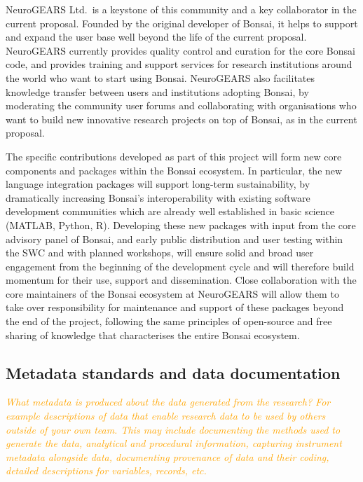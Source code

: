 \documentclass[a4paper,11pt]{article}
\begin{document}
NeuroGEARS Ltd.\ is a keystone of this community and a key collaborator in the
current proposal. Founded by the original developer of Bonsai, it helps to
support and expand the user base well beyond the life of the current proposal.
NeuroGEARS currently provides quality control and curation for the core Bonsai
code, and provides training and support services for research institutions
around the world who want to start using Bonsai. NeuroGEARS also facilitates
knowledge transfer between users and institutions adopting Bonsai, by
moderating the community user forums and collaborating with organisations who
want to build new innovative research projects on top of Bonsai, as in the
current proposal.

The specific contributions developed as part of this project will form new core
components and packages within the Bonsai ecosystem. In particular, the new
language integration packages will support long-term sustainability, by
dramatically increasing Bonsai's interoperability with existing software
development communities which are already well established in basic science
(MATLAB, Python, R). Developing these new packages with input from the core
advisory panel of Bonsai, and early public distribution and user testing within
the SWC and with planned workshops, will ensure solid and broad user engagement
from the beginning of the development cycle and will therefore build momentum
for their use, support and dissemination. Close collaboration with the core
maintainers of the Bonsai ecosystem at NeuroGEARS will allow them to take over
responsibility for maintenance and support of these packages beyond the end of
the project, following the same principles of open-source and free sharing of
knowledge that characterises the entire Bonsai ecosystem.

\subsection{Metadata standards and data documentation}

\textcolor{orange}{\textit{What metadata is produced about the data generated from the research? For example descriptions of data that enable research data to be used by others outside of your own team.  This may include documenting the methods used to generate the data, analytical and procedural information, capturing instrument metadata alongside data, documenting provenance of data and their coding, detailed descriptions for variables, records, etc.}}
\end{document}
